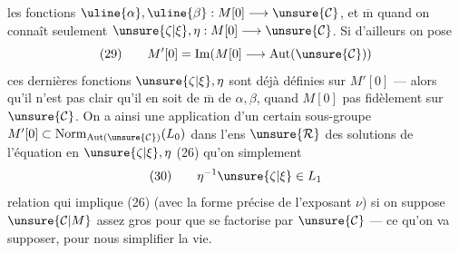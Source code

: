 
les fonctions $\uline{\alpha},\uline{\beta}:M[0]\longrightarrow\unsure{\mathcal{C}}$,
et $\overline{\mathrm m}$ quand on connaît seulement
$\unsure{\zeta|\xi},\eta:M[0]\longrightarrow\unsure{\mathcal{C}}$.
Si d'ailleurs on pose
\[
(29)\qquad
M'[0]=\operatorname{Im}(M[0]\longrightarrow\operatorname{Aut}(\unsure{\mathcal{C}}))
\]
ces dernières fonctions $\unsure{\zeta|\xi},\eta$ sont déjà définies sur $M'[0]$ --- alors qu'il
n'est pas clair qu'il en soit de $\overline{\mathrm m}$ de $\alpha,\beta$, quand
$M[0]$  pas fidèlement sur $\unsure{\mathcal{C}}$.
On a ainsi une application \inserted{$(\unsure{\zeta|\xi},\eta)$} d'un certain sous-groupe
$M'[0]\subset\operatorname{Norm}_{\operatorname{Aut}(\unsure{\mathcal{C}})}(L_0)$
dans l'ens $\unsure{\mathcal{R}}$ des solutions de l'équation en $\unsure{\zeta|\xi},\eta$
(26) qu'on  simplement
\[
(30)\qquad \eta^{-1}\unsure{\zeta|\xi}\in L_1
\]
relation qui implique (26) (avec la forme précise de l'exposant $\nu$)
si on suppose  $\unsure{\mathcal{C}|M}$ assez gros pour que
se factorise par $\unsure{\mathcal{C}}$ --- ce qu'on va supposer, pour nous simplifier la vie.

